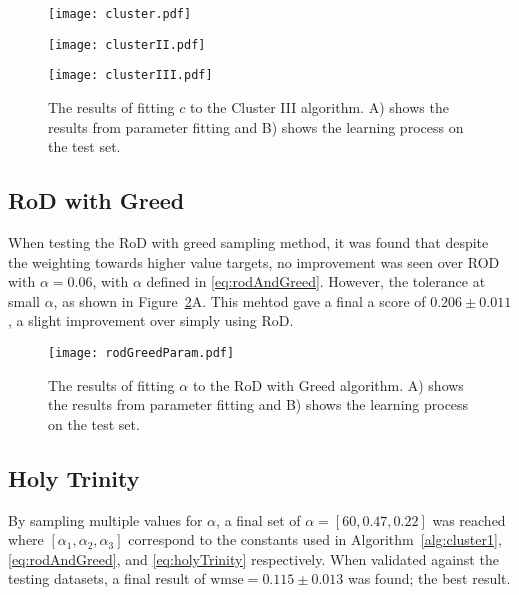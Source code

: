 \begin{figure}[H]
    \begin{center}
        \texttt{[image: cluster.pdf]}
    \end{center}
\end{figure}
\begin{figure}[H]
    \begin{center}
        \texttt{[image: clusterII.pdf]}
    \end{center}
\end{figure}
\begin{figure}[H]
    \begin{center}
        \texttt{[image: clusterIII.pdf]}
        \caption[Cluster III]{The results of fitting $c$ to the Cluster III algorithm. A) shows the results from parameter fitting and B) shows the learning process on the test set.}
        \label{fig:clusterTest}
    \end{center}
\end{figure}

\subsection{RoD with Greed}
When testing the RoD with greed sampling method, it was found that despite the weighting towards higher value targets, no improvement was seen over ROD with $\alpha{}=0.06$, with $\alpha$ defined in \ref{eq:rodAndGreed}. However, the tolerance at small $\alpha$, as shown in Figure~\ref{fig:rogreed}A. This mehtod gave a final a score of ${0.206\pm{}0.011}$, a slight improvement over simply using RoD.

\begin{figure}[H]
    \begin{center}
        \texttt{[image: rodGreedParam.pdf]}
        \caption[RoD with Greed]{The results of fitting $\alpha{}$ to the RoD with Greed algorithm. A) shows the results from parameter fitting and B) shows the learning process on the test set.}
        \label{fig:rogreed}
    \end{center}
\end{figure}

\subsection{Holy Trinity}
By sampling multiple values for $\alpha$, a final set of $\alpha=[60, 0.47, 0.22]$ was reached where $[\alpha{}_1, \alpha{}_2, \alpha{}_3]$ correspond to the constants used in Algorithm~\ref{alg:cluster1}, \ref{eq:rodAndGreed}, and \ref{eq:holyTrinity} respectively. When validated against the testing datasets, a final result of $\mathrm{wmse}=0.115\pm{}0.013$ was found; the best result.

